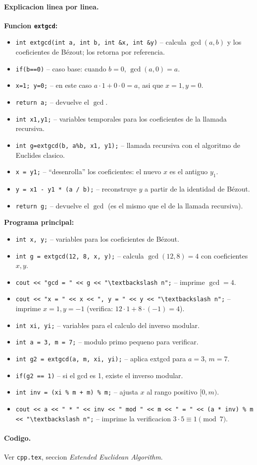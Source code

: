 \paragraph{Explicacion linea por linea.}
\textbf{Funcion \texttt{extgcd}:}
\begin{itemize}\setlength\itemsep{0pt}
	\item \verb|int extgcd(int a, int b, int &x, int &y)| -- calcula $\gcd(a,b)$ y los coeficientes de B\'ezout; los retorna por referencia.
	\item \verb|if(b==0)| -- caso base: cuando $b=0$, $\gcd(a, 0) = a$.
	\item \verb|x=1; y=0;| -- en este caso $a \cdot 1 + 0 \cdot 0 = a$, asi que $x=1, y=0$.
	\item \verb|return a;| -- devuelve el $\gcd$.
	\item \verb|int x1,y1;| -- variables temporales para los coeficientes de la llamada recursiva.
	\item \verb|int g=extgcd(b, a%b, x1, y1);| -- llamada recursiva con el algoritmo de Euclides clasico.
	\item \verb|x = y1;| -- ``desenrolla'' los coeficientes: el nuevo $x$ es el antiguo $y_1$.
	\item \verb|y = x1 - y1 * (a / b);| -- reconstruye $y$ a partir de la identidad de B\'ezout.
	\item \verb|return g;| -- devuelve el $\gcd$ (es el mismo que el de la llamada recursiva).
\end{itemize}
\textbf{Programa principal:}
\begin{itemize}\setlength\itemsep{0pt}
	\item \verb|int x, y;| -- variables para los coeficientes de B\'ezout.
	\item \verb|int g = extgcd(12, 8, x, y);| -- calcula $\gcd(12,8)=4$ con coeficientes $x, y$.
	\item \verb|cout << "gcd = " << g << "\textbackslash n";| -- imprime $\gcd = 4$.
	\item \verb|cout << "x = " << x << ", y = " << y << "\textbackslash n";| -- imprime $x=1, y=-1$ (verifica: $12 \cdot 1 + 8 \cdot (-1) = 4$).
	\item \verb|int xi, yi;| -- variables para el calculo del inverso modular.
	\item \verb|int a = 3, m = 7;| -- modulo primo pequeno para verificar.
	\item \verb|int g2 = extgcd(a, m, xi, yi);| -- aplica extgcd para $a=3$, $m=7$.
	\item \verb|if(g2 == 1)| -- si el gcd es 1, existe el inverso modular.
	\item \verb|int inv = (xi % m + m) % m;| -- ajusta $x$ al rango positivo $[0, m)$.
	\item \verb|cout << a << " * " << inv << " mod " << m << " = " << (a * inv) % m << "\textbackslash n";| -- imprime la verificacion $3 \cdot 5 \equiv 1 \pmod 7$.
\end{itemize}

\paragraph{Codigo.}
Ver \texttt{cpp.tex}, seccion \textit{Extended Euclidean Algorithm}.

\vspace{0.5em|||}

